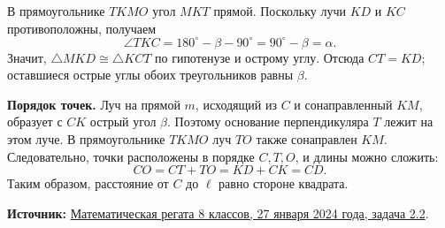 \documentclass[a4paper,11pt]{article}
\begin{document}
В прямоугольнике $TKMO$ угол $MKT$ прямой. Поскольку лучи $KD$ и $KC$
противоположны, получаем
\[
  \angle TKC=180^\circ-\beta-90^\circ=90^\circ-\beta=\alpha.
\]
Значит, $\triangle MKD\cong\triangle KCT$ по гипотенузе и острому углу.
Отсюда $CT=KD$; оставшиеся острые углы обоих треугольников равны $\beta$.

\textbf{Порядок точек.}
Луч на прямой $m$, исходящий из $C$ и сонаправленный $KM$, образует с $CK$
острый угол $\beta$. Поэтому основание перпендикуляра $T$ лежит на этом луче.
В прямоугольнике $TKMO$ луч $TO$ также сонаправлен $KM$.
Следовательно, точки расположены в порядке $C,T,O$, и длины можно сложить:
\[
  \boxed{CO=CT+TO=KD+CK=CD.}
\]
Таким образом, расстояние от $C$ до $\ell$ равно стороне квадрата.

\textbf{Источник:}
\href{https://olympiads.mccme.ru/regata/20232024/reg8.htm}{Математическая регата
8 классов, 27 января 2024 года, задача 2.2}.
\end{document}
